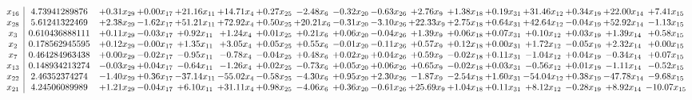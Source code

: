 \documentclass[9pt]{article}
\begin{document}
 \[\begin{array}{c| c c@{\hskip 2pt} c@{\hskip 2pt} c@{\hskip 2pt} c@{\hskip 2pt} c@{\hskip 2pt} c@{\hskip 2pt} c@{\hskip 2pt} c@{\hskip 2pt} c@{\hskip 2pt} c@{\hskip 2pt} c@{\hskip 2pt} c@{\hskip 2pt} c@{\hskip 2pt} c@{\hskip 2pt} c@{\hskip 2pt} }
 x_{16}   &  4.73941289876 & +  0.31 x_{29} & +  0.00 x_{17} & + 21.16 x_{11} & + 14.71 x_{4} & +  0.27 x_{25} & -2.48 x_{6} & -0.32 x_{20} & -0.63 x_{26} & +  2.76 x_{9} & +  1.38 x_{18} & +  0.19 x_{31} & + 31.46 x_{12} & +  0.34 x_{19} & + 22.00 x_{14} & +  7.41 x_{15}\\
 x_{28}   &  5.61241322469 & +  2.38 x_{29} & -1.62 x_{17} & + 51.21 x_{11} & + 72.92 x_{4} & +  0.50 x_{25} & + 20.21 x_{6} & -0.31 x_{20} & -3.10 x_{26} & + 22.33 x_{9} & +  2.75 x_{18} & +  0.64 x_{31} & + 42.64 x_{12} & -0.04 x_{19} & + 52.92 x_{14} & -1.13 x_{15}\\
 x_{3}   &  0.610436888111 & +  0.11 x_{29} & -0.03 x_{17} & +  0.92 x_{11} & +  1.24 x_{4} & +  0.01 x_{25} & +  0.21 x_{6} & +  0.06 x_{20} & -0.04 x_{26} & +  1.39 x_{9} & +  0.06 x_{18} & +  0.07 x_{31} & +  0.10 x_{12} & +  0.03 x_{19} & +  1.39 x_{14} & +  0.58 x_{15}\\
 x_{2}   &  0.178562945595 & +  0.12 x_{29} & -0.00 x_{17} & +  1.35 x_{11} & +  3.05 x_{4} & +  0.05 x_{25} & +  0.55 x_{6} & -0.01 x_{20} & -0.11 x_{26} & +  0.57 x_{9} & +  0.12 x_{18} & +  0.00 x_{31} & +  1.72 x_{12} & -0.05 x_{19} & +  2.32 x_{14} & +  0.00 x_{15}\\
 x_{7}   &  0.464284963438 & +  0.00 x_{29} & -0.02 x_{17} & -0.95 x_{11} & -0.78 x_{4} & -0.04 x_{25} & +  0.48 x_{6} & +  0.02 x_{20} & +  0.04 x_{26} & +  0.59 x_{9} & -0.02 x_{18} & +  0.11 x_{31} & -1.04 x_{12} & +  0.04 x_{19} & -0.34 x_{14} & +  0.07 x_{15}\\
 x_{13}   &  0.148934213274 & -0.03 x_{29} & +  0.04 x_{17} & -0.64 x_{11} & -1.26 x_{4} & +  0.02 x_{25} & -0.73 x_{6} & +  0.05 x_{20} & +  0.06 x_{26} & +  0.65 x_{9} & -0.02 x_{18} & +  0.03 x_{31} & -0.56 x_{12} & +  0.01 x_{19} & -1.11 x_{14} & -0.52 x_{15}\\
 x_{22}   &  2.46352374274 & -1.40 x_{29} & +  0.36 x_{17} & -37.14 x_{11} & -55.02 x_{4} & -0.58 x_{25} & -4.30 x_{6} & +  0.95 x_{20} & +  2.30 x_{26} & -1.87 x_{9} & -2.54 x_{18} & +  1.60 x_{31} & -54.04 x_{12} & +  0.38 x_{19} & -47.78 x_{14} & -9.68 x_{15}\\
 x_{21}   &  4.24506089989 & +  1.21 x_{29} & -0.04 x_{17} & +  6.10 x_{11} & + 31.11 x_{4} & +  0.98 x_{25} & -4.06 x_{6} & +  0.36 x_{20} & -0.61 x_{26} & + 25.69 x_{9} & +  1.04 x_{18} & +  0.11 x_{31} & +  8.12 x_{12} & -0.28 x_{19} & +  8.92 x_{14} & -10.07 x_{15}\\

\end{array}\]
\end{document}
